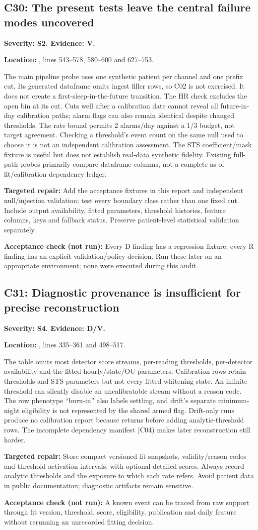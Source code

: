 \documentclass[11pt,a4paper]{article}
\newcommand{\code}[1]{\texttt{\detokenize{#1}}}
\newcommand{\loc}[2]{\par\textbf{Location:} \code{#1}, lines #2.\par}
\newcommand{\finding}[4]{\subsection{#1: #4}\label{issue:#1}\textbf{Severity: #2. Evidence: #3.}\par}
\newcommand{\repair}{\par\textbf{Targeted repair:} }
\newcommand{\checklater}{\par\textbf{Acceptance check (not run):} }
\begin{document}
\finding{C30}{S2}{V}{The present tests leave the central failure modes uncovered}
\loc{wearable/selftest.py}{543--578, 580--600 and 627--753}
The main pipeline probe uses one synthetic patient per channel and one prefix cut.
Its generated dataframe omits ingest filler rows, so C02 is not exercised. It does
not create a first-sleep-in-the-future transition. The HR check excludes the open
bin at its cut. Cuts well after a calibration date cannot reveal all future-in-day
calibration paths; alarm flags can also remain identical despite changed thresholds.
The rate bound permits 2 alarms/day against a 1/3 budget, not target agreement.
Checking a threshold's event count on the same null used to choose it is not an
independent calibration assessment. The STS coefficient/mask fixture is useful but
does not establish real-data synthetic fidelity. Existing full-path probes primarily
compare dataframe columns, not a complete as-of fit/calibration dependency ledger.
\repair Add the acceptance fixtures in this report and independent null/injection
validation; test every boundary class rather than one fixed cut. Include output
availability, fitted parameters, threshold histories, feature columns, keys and
fallback status. Preserve patient-level statistical validation separately.
\checklater Every D finding has a regression fixture; every R finding has an
explicit validation/policy decision. Run these later on an appropriate environment;
none were executed during this audit.

\finding{C31}{S4}{D/V}{Diagnostic provenance is insufficient for precise reconstruction}
\loc{wearable/steps/detect.py}{335--361 and 498--517}
The table omits most detector score streams, per-reading thresholds, per-detector
availability and the fitted hourly/state/OU parameters. Calibration rows retain
thresholds and STS parameters but not every fitted whitening state. An infinite
threshold can silently disable an uncalibratable stream without a reason code.
The row phenotype ``burn-in'' also labels settling, and drift's separate minimum-night eligibility is not represented
by the shared armed flag. Drift-only runs produce no calibration report because
\code{_thresholds} returns before adding analytic-threshold rows. The incomplete
dependency manifest (C04) makes later reconstruction still harder.
\repair Store compact versioned fit snapshots, validity/reason codes and threshold
activation intervals, with optional detailed scores. Always record analytic
thresholds and the exposure to which each rate refers. Avoid patient data in public
documentation; diagnostic artifacts remain sensitive.
\checklater A known event can be traced from raw support through fit version,
threshold, score, eligibility, publication and daily feature without rerunning an
unrecorded fitting decision.
\end{document}
